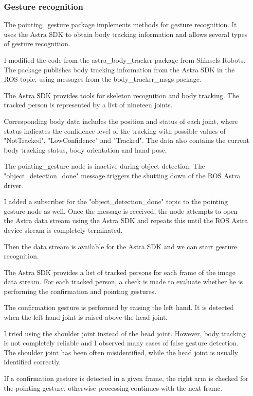 \subsubsection{Gesture recognition}
The pointing\_gesture package implements methods for gesture recognition. It uses the Astra SDK to obtain body tracking information and allows several types of gesture recognition.\par
I modified the code from the astra\_body\_tracker package from Shinsels Robots. The package publishes body tracking information from the Astra SDK in the ROS topic, using messages from the body\_tracker\_msgs package.\par
The Astra SDK provides tools for skeleton recognition and body tracking. The tracked person is represented by a list of nineteen joints.\par
Corresponding body data includes the position and status of each joint, where status indicates the confidence level of the tracking with possible values of "NotTracked", "LowConfidence" and "Tracked".
The data also contains the current body tracking status, body orientation and hand pose.\par
The pointing\_gesture node is inactive during object detection. 
The "object\_detection\_done" message triggers the shutting down of the ROS Astra driver.\par
I added a subscriber for the "object\_detection\_done" topic to the pointing gesture node as well. Once the message is received, the node attempts to open the Astra data stream using the Astra SDK and repeats this until the ROS Astra device stream is completely terminated.\par
Then the data stream is available for the Astra SDK and we can start gesture recognition.\par 
The Astra SDK provides a list of tracked persons for each frame of the image data stream. For each tracked person, a check is made to evaluate whether he is performing the confirmation and pointing gestures.\par
The confirmation gesture is performed by raising the left hand. It is detected when the left hand joint is raised above the head joint.\par
I tried using the shoulder joint instead of the head joint. However, body tracking is not completely reliable and I observed many cases of false gesture detection. The shoulder joint has been often misidentified, while the head joint is usually identified correctly.\par
If a confirmation gesture is detected in a given frame, the right arm is checked for the pointing gesture, otherwise processing continues with the next frame.\par

